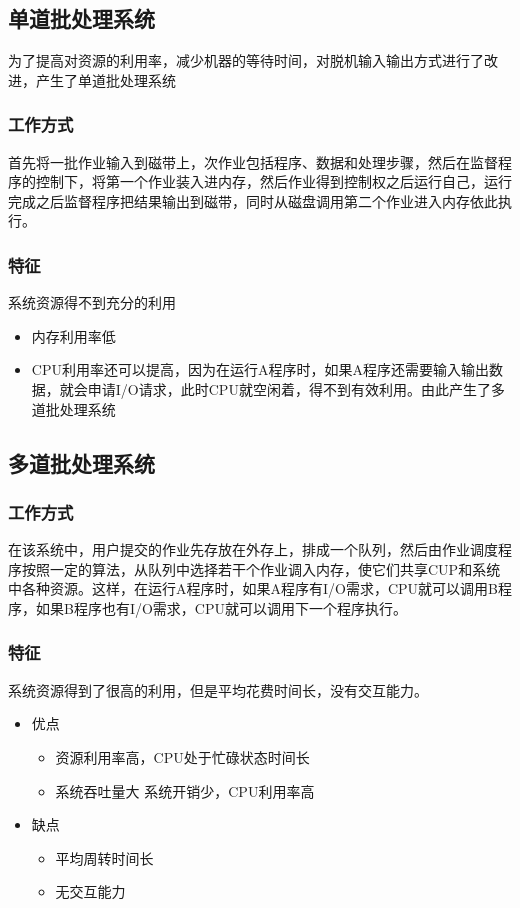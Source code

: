 \documentclass[]{scrartcl}
\begin{document}
	\subsection{单道批处理系统}
	\quad
	
	为了提高对资源的利用率，减少机器的等待时间，对脱机输入输出方式进行了改进，产生了单道批处理系统
		\subsubsection{工作方式}
			首先将一批作业输入到磁带上，次作业包括程序、数据和处理步骤，然后在监督程序的控制下，将第一个作业装入进内存，然后作业得到控制权之后运行自己，运行完成之后监督程序把结果输出到磁带，同时从磁盘调用第二个作业进入内存依此执行。
		\subsubsection{特征}
		系统资源得不到充分的利用
		\begin{itemize}
			\item 内存利用率低
			\item CPU利用率还可以提高，因为在运行A程序时，如果A程序还需要输入输出数据，就会申请I/O请求，此时CPU就空闲着，得不到有效利用。由此产生了多道批处理系统
		\end{itemize}
	\subsection{多道批处理系统}
	\quad
		
		\subsubsection{工作方式}
		在该系统中，用户提交的作业先存放在外存上，排成一个队列，然后由作业调度程序按照一定的算法，从队列中选择若干个作业调入内存，使它们共享CUP和系统中各种资源。这样，在运行A程序时，如果A程序有I/O需求，CPU就可以调用B程序，如果B程序也有I/O需求，CPU就可以调用下一个程序执行。
		\subsubsection{特征}
		系统资源得到了很高的利用，但是平均花费时间长，没有交互能力。
		\begin{itemize}
			\item 优点
				\begin{itemize}
					\item 资源利用率高，CPU处于忙碌状态时间长
					\item 系统吞吐量大 系统开销少，CPU利用率高 
				\end{itemize}
			\item 缺点
				\begin{itemize}
					\item 平均周转时间长
					\item 无交互能力
				\end{itemize}
		\end{itemize}
	
\end{document}
